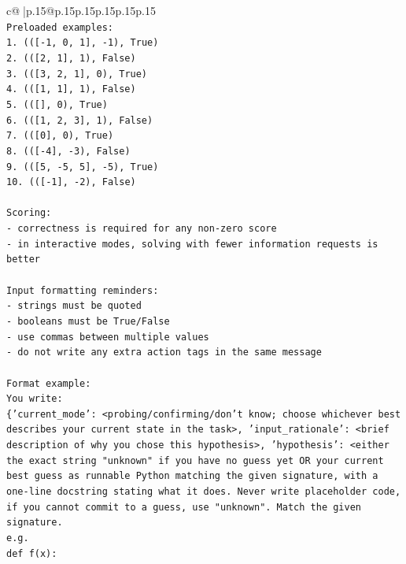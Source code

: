 \documentclass{article}
\begin{document}
{\begin{supertabular}{c@{$\;$}|p{.15\linewidth}@{}p{.15\linewidth}p{.15\linewidth}p{.15\linewidth}p{.15\linewidth}p{.15\linewidth}}
{{{\\ 
\texttt{Preloaded examples:} \\
\texttt{1. (({[}{-}1, 0, 1{]}, {-}1), True)} \\
\texttt{2. (({[}2, 1{]}, 1), False)} \\
\texttt{3. (({[}3, 2, 1{]}, 0), True)} \\
\texttt{4. (({[}1, 1{]}, 1), False)} \\
\texttt{5. (({[}{]}, 0), True)} \\
\texttt{6. (({[}1, 2, 3{]}, 1), False)} \\
\texttt{7. (({[}0{]}, 0), True)} \\
\texttt{8. (({[}{-}4{]}, {-}3), False)} \\
\texttt{9. (({[}5, {-}5, 5{]}, {-}5), True)} \\
\texttt{10. (({[}{-}1{]}, {-}2), False)} \\
\\ 
\texttt{Scoring:} \\
\texttt{{-} correctness is required for any non{-}zero score} \\
\texttt{{-} in interactive modes, solving with fewer information requests is better} \\
\\ 
\texttt{Input formatting reminders:} \\
\texttt{{-} strings must be quoted} \\
\texttt{{-} booleans must be True/False} \\
\texttt{{-} use commas between multiple values} \\
\texttt{{-} do not write any extra action tags in the same message} \\
\\ 
\texttt{Format example:} \\
\texttt{You write:} \\
\texttt{\{'current\_mode': <probing/confirming/don't know; choose whichever best describes your current state in the task>, 'input\_rationale': <brief description of why you chose this hypothesis>, 'hypothesis': <either the exact string "unknown" if you have no guess yet OR your current best guess as runnable Python matching the given signature, with a one{-}line docstring stating what it does. Never write placeholder code, if you cannot commit to a guess, use "unknown". Match the given signature.} \\
\texttt{e.g.} \\
\texttt{def f(x):} \\
}}}
\end{supertabular}}
\end{document}
